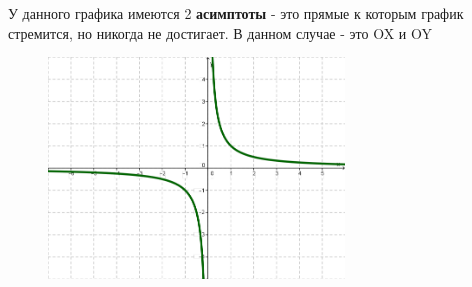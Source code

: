 У данного графика имеются 2 \textbf{асимптоты} - это прямые к которым график стремится, но никогда не достигает. В данном случае - это OX и OY

\begin{figure}[h!]
	\centering
	\includegraphics[width=0.7\textwidth]{img/hyp_f.png}
\end{figure}
